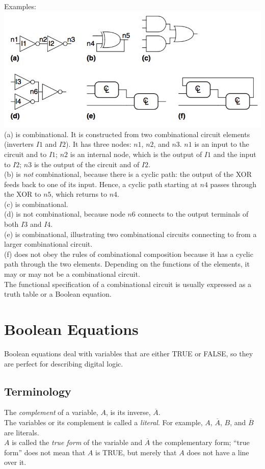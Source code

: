 \documentclass[12pt]{article}
\theoremstyle{definition}
\begin{document}
  Examples: \\
  \includegraphics{pictures/combinationalCircuitExample.png}
  (a) is combinational. It is constructed from two combinational circuit elements (inverters $I1$ and $I2$). It has three nodes: $n1$, $n2$, and $n3$. $n1$ is an input to the circuit and to $I1$; $n2$ is an internal node, which is the output of $I1$ and the input to $I2$; $n3$ is the output of the circuit and of $I2$. \\
  (b) is \emph{not} combinational, because there is a cyclic path: the output of the XOR feeds back to one of its input. Hence, a cyclic path starting at $n4$ passes through the XOR to $n5$, which returns to $n4$. \\
  (c) is combinational. \\
  (d) is not combinational, because node $n6$ connects to the output terminals of both $I3$ and $I4$. \\
  (e) is combinational, illustrating two combinational circuits connecting to from a larger combinational circuit. \\
  (f) does not obey the rules of combinational composition because it has a cyclic path through the two elements. Depending on the functions of the elements, it may or may not be a combinational circuit. \\

  The functional specification of a combinational circuit is usually expressed as a truth table or a Boolean equation.

  \section{Boolean Equations}
  Boolean equations deal with variables that are either TRUE or FALSE, so they are perfect for describing digital logic.

  \subsection{Terminology}
  The \emph{complement} of a variable, $A$, is its inverse, $\overline{A}$. \\
  The variables or its complement is called a \emph{literal}.
  For example, $A$, $\overline{A}$, $B$, and $\overline{B}$ are literals. \\
  $A$ is called the \emph{true form} of the variable and $\overline{A}$ the complementary form; ``true form'' does not mean that $A$ is TRUE, but merely that $A$ does not have a line over it. \\
\end{document}

